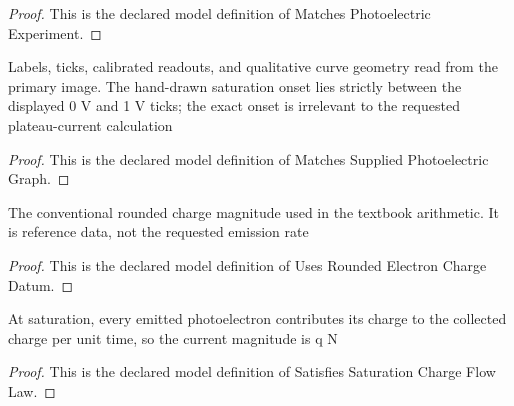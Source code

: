 \begin{proof}
  This is the declared model definition of Matches Photoelectric Experiment.
\end{proof}
\begin{definition}
  \label{def:physics:phyx-mini-0642:phyxminiproblems-problemphyxmini0642-matchessuppliedphotoelectricgraph}
  Labels, ticks, calibrated readouts, and qualitative curve geometry read from the primary image. The hand-drawn saturation onset lies strictly between the displayed 0 V and 1 V ticks; the exact onset is irrelevant to the requested plateau-current calculation
\end{definition}
\begin{proof}
  This is the declared model definition of Matches Supplied Photoelectric Graph.
\end{proof}
\begin{definition}
  \label{def:physics:phyx-mini-0642:phyxminiproblems-problemphyxmini0642-usesroundedelectronchargedatum}
  The conventional rounded charge magnitude used in the textbook arithmetic. It is reference data, not the requested emission rate
\end{definition}
\begin{proof}
  This is the declared model definition of Uses Rounded Electron Charge Datum.
\end{proof}
\begin{definition}
  \label{def:physics:phyx-mini-0642:phyxminiproblems-problemphyxmini0642-satisfiessaturationchargeflowlaw}
  At saturation, every emitted photoelectron contributes its charge to the collected charge per unit time, so the current magnitude is q N
\end{definition}
\begin{proof}
  This is the declared model definition of Satisfies Saturation Charge Flow Law.
\end{proof}
